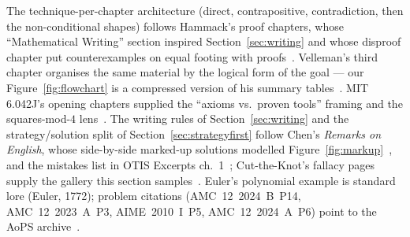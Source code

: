 \chapternotes
The technique-per-chapter architecture (direct, contrapositive, contradiction,
then the non-conditional shapes) follows Hammack's proof chapters, whose
``Mathematical Writing'' section inspired Section~\ref{sec:writing} and whose
disproof chapter put counterexamples on equal footing with
proofs~\cite{hammack}. Velleman's third chapter organises the same material by
the logical form of the goal --- our Figure~\ref{fig:flowchart} is a compressed
version of his summary tables~\cite{velleman}. MIT 6.042J's opening chapters
supplied the ``axioms vs.\ proven tools'' framing and the
squares-mod-$4$ lens~\cite{mcs}. The writing rules of
Section~\ref{sec:writing} and the strategy/solution split of
Section~\ref{sec:strategyfirst} follow Chen's \emph{Remarks on English}, whose
side-by-side marked-up solutions modelled Figure~\ref{fig:markup}~\cite{chen-english},
and the mistakes list in OTIS Excerpts ch.~1~\cite{otis}; Cut-the-Knot's
fallacy pages supply the gallery this section samples~\cite{cuttheknot}.
Euler's polynomial example is standard lore (Euler, 1772); problem citations
(AMC~12~2024~B~P14, AMC~12~2023~A~P3, AIME~2010~I~P5, AMC~12~2024~A~P6) point to
the AoPS archive~\cite{aops-amc}.
